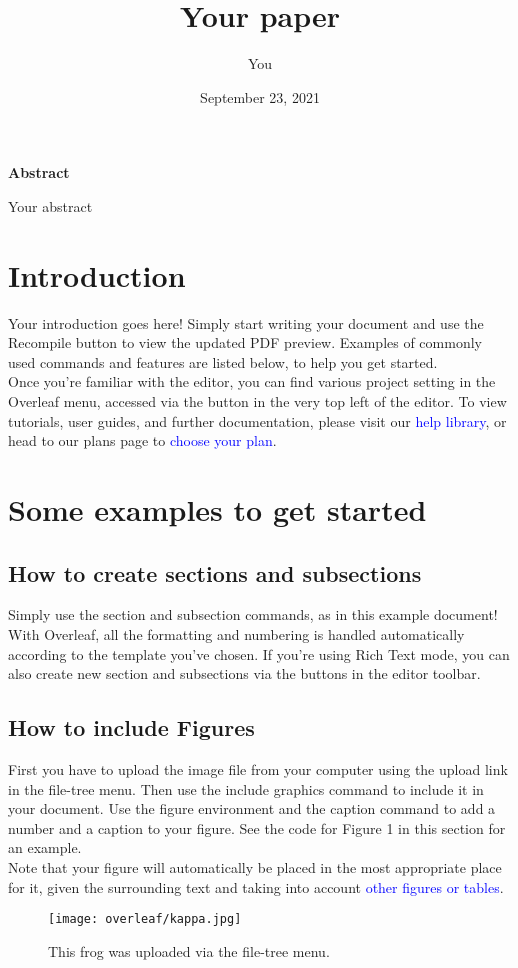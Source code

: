 \documentclass{article}
\title{Your paper}
\author{You}
\date{September 23, 2021}
\begin{document}
		\maketitle
		\begin{center}
	\textbf{Abstract}
\end{center}

	Your abstract
	\section{Introduction}
	Your introduction goes here! Simply start writing your document and use the Recompile button to
	view the updated PDF preview. Examples of commonly used commands and features are listed below,
	to help you get started.\\
	
	Once you’re familiar with the editor, you can find various project setting in the Overleaf menu,
	accessed via the button in the very top left of the editor. To view tutorials, user guides, and further
	documentation, please visit our \textcolor{blue}{help library}, or head to our plans page to \textcolor{blue}{choose your plan}.
	
	
	\section{Some examples to get started}
	\subsection{How to create sections and subsections}
	Simply use the section and subsection commands, as in this example document! With Overleaf, all
	the formatting and numbering is handled automatically according to the template you’ve chosen. If
	you’re using Rich Text mode, you can also create new section and subsections via the buttons in the
	editor toolbar.
		\subsection{How to include Figures}
First you have to upload the image file from your computer using the upload link in the file-tree menu.
Then use the include graphics command to include it in your document. Use the figure environment
and the caption command to add a number and a caption to your figure. See the code for Figure 1 in
this section for an example.\\

Note that your figure will automatically be placed in the most appropriate place for it, given the
surrounding text and taking into account \textcolor{blue}{other figures or tables}.
\begin{figure}
	\begin{center}
\texttt{[image: overleaf/kappa.jpg]}
\caption{This frog was uploaded via the file-tree menu.}
\end{center}
\end{figure}
\newpage
\end{document}
